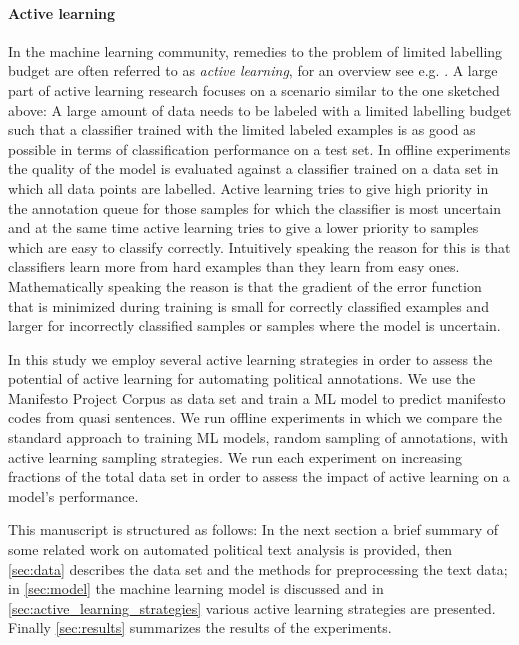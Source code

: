 \documentclass[runningheads,a4paper]{article}
\begin{document}
\paragraph{Active learning}
In the machine learning community, remedies to the problem of limited labelling budget are often referred to as \textit{active learning}, for an overview see e.g. \cite{2012Settles}. A large part of active learning research focuses on a scenario similar to the one sketched above: A large amount of data needs to be labeled with a limited labelling budget such that a classifier trained with the limited labeled examples is as good as possible in terms of classification performance on a test set. In offline experiments the quality of the model is evaluated against a classifier trained on a data set in which all data points are labelled.
Active learning tries to give high priority in the annotation queue for those samples for which the classifier is most uncertain and at the same time active learning tries to give a lower priority to samples which are easy to classify correctly. Intuitively speaking the reason for this is that classifiers learn more from hard examples than they learn from easy ones. Mathematically speaking the reason is that the gradient of the error function that is minimized during training is small for correctly classified examples and larger for incorrectly classified samples or samples where the model is uncertain.

In this study we employ several active learning strategies in order to assess the potential of active learning for automating political annotations. We use the Manifesto Project Corpus as data set and train a ML model to predict manifesto codes from quasi sentences. We run offline experiments in which we compare the standard approach to training ML models, random sampling of annotations, with active learning sampling strategies. We run each experiment on increasing fractions of the total data set in order to assess the impact of active learning on a model's performance. 

This manuscript is structured as follows: In the next section a brief summary of some related work on automated political text analysis is provided, then \autoref{sec:data} describes the data set and the methods for preprocessing the text data; in \autoref{sec:model} the machine learning model is discussed and in \autoref{sec:active_learning_strategies} various active learning strategies are presented. Finally \autoref{sec:results} summarizes the results of the experiments. 
\end{document}

